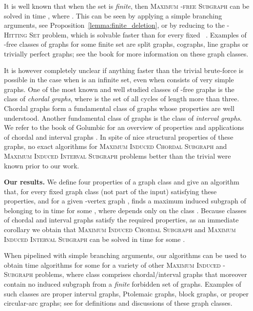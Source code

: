 It is well known that when the set  is \emph{finite}, then \textsc{Maximum -free Subgraph} can be solved in time , where . This can be seen by applying a simple branching arguments, see Proposition~\ref{lemma:finite_deletion}, or by reducing to the \textsc{-Hitting Set} problem, which is solvable faster than  for every fixed ~\cite{FominGKLS10,Gaspers:2008rf}. Examples of -free classes of graphs for some finite set  are split  graphs, cographs, line graphs or trivially perfect graphs; see the book \cite{brandstadt1999graph} for more information on these graph classes.

It is however completely unclear if anything faster than the trivial brute-force is possible in the case when  is an infinite set, even when  consists of very simple graphs. One of the most known  and well studied classes of -free graphs is the class of  \emph{chordal graphs}, where  is the set of all cycles of length more than three.  Chordal graphs form a fundamental class of graphs whose properties are well understood. Another fundamental class of graphs is the class of \emph{interval graphs}. We refer to the book  of Golumbic  for an overview of properties and applications of chordal and interval graphs \cite{Golumbic80}. In spite of nice structural properties of these graphs,  no exact algorithms for \textsc{Maximum Induced Chordal Subgraph} and \textsc{Maximum Induced Interval Subgraph} problems better than the trivial  were known prior to our work.
 
\smallskip\noindent\textbf{Our results.} 
We define four properties of a graph class and give an algorithm that, for every fixed graph class  (not part of the input) satisfying these properties, and for a given -vertex graph , finds a maximum induced subgraph of  belonging to  in time  for some , where  depends only on the class . Because classes of chordal and interval graphs satisfy the required properties, as an immediate corollary we obtain that \textsc{Maximum Induced Chordal Subgraph} and \textsc{Maximum Induced Interval Subgraph} can be solved in time  for some .

When pipelined with simple branching arguments, our algorithms can be used to obtain time   algorithms for some   for a variety of other \textsc{Maximum Induced -Subgraph} problems, where class  comprises chordal/interval graphs that moreover contain no induced subgraph from a \emph{finite} forbidden set of graphs. 
Examples of such classes are proper interval graphs, Ptolemaic graphs, block graphs, or proper circular-arc graphs; see \cite{brandstadt1999graph} for definitions and discussions of these graph classes.


